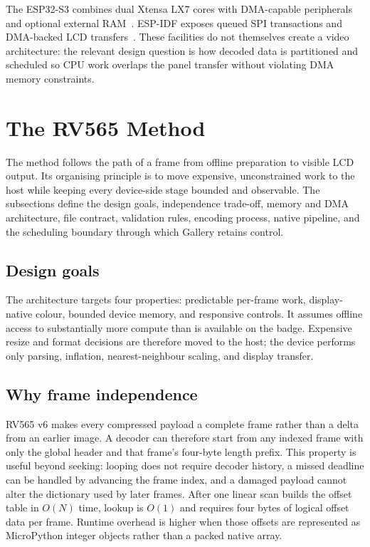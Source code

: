 \documentclass[11pt,twocolumn]{article}
\newcommand{\system}{RV565}
\begin{document}
The ESP32-S3 combines dual Xtensa LX7 cores with DMA-capable peripherals and
optional external RAM~\cite{espressif2023datasheet}.  ESP-IDF exposes queued
SPI transactions and DMA-backed LCD transfers~\cite{espressif2026spi}.  These
facilities do not themselves create a video architecture: the relevant design
question is how decoded data is partitioned and scheduled so CPU work overlaps
the panel transfer without violating DMA memory constraints.

\section{The \system{} Method}

The method follows the path of a frame from offline preparation to visible LCD
output.  Its organising principle is to move expensive, unconstrained work to
the host while keeping every device-side stage bounded and observable.  The
subsections define the design goals, independence trade-off, memory and DMA
architecture, file contract, validation rules, encoding process, native
pipeline, and the scheduling boundary through which Gallery retains control.

\subsection{Design goals}

The architecture targets four properties: predictable per-frame work,
display-native colour, bounded device memory, and responsive controls.  It
assumes offline access to substantially more compute than is available on the
badge.  Expensive resize and format decisions are therefore moved to the host;
the device performs only parsing, inflation, nearest-neighbour scaling, and
display transfer.

\subsection{Why frame independence}

RV565 v6 makes every compressed payload a complete frame rather than a delta
from an earlier image.  A decoder can therefore start from any indexed frame
with only the global header and that frame's four-byte length prefix.  This
property is useful beyond seeking: looping does not require decoder history, a
missed deadline can be handled by advancing the frame index, and a damaged
payload cannot alter the dictionary used by later frames.  After one linear
scan builds the offset table in $O(N)$ time, lookup is $O(1)$ and requires four
bytes of logical offset data per frame.  Runtime overhead is higher when those
offsets are represented as MicroPython integer objects rather than a packed
native array.
\end{document}

